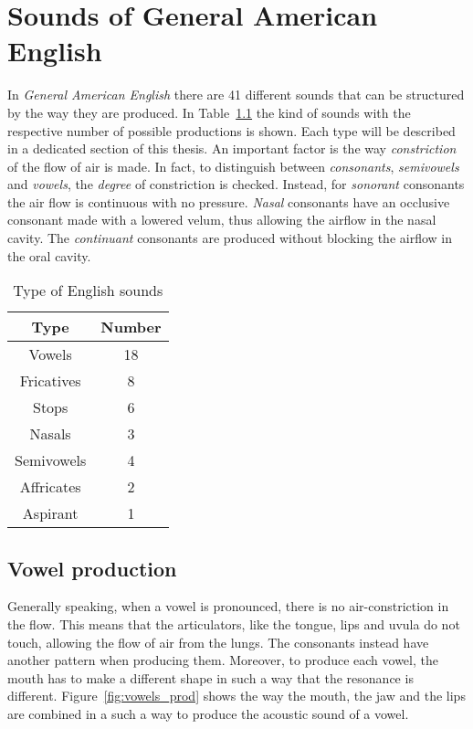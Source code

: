 \chapter{Sounds of General American English}
\label{ch:english_language}
In \textit{General American English} there are 41 different sounds that can be structured by the way they are produced. In Table~\ref{table:english_sounds} the kind of sounds with the respective number of possible productions is shown. Each type will be described in a dedicated section of this thesis. An important factor is the way \textit{constriction} of the flow of air is made. In fact, to distinguish between \textit{consonants}, \textit{semivowels} and \textit{vowels}, the \textit{degree} of constriction is checked. Instead, for \textit{sonorant} consonants the air flow is continuous with no pressure. \textit{Nasal} consonants have an occlusive consonant made with a lowered velum, thus allowing the airflow in the nasal cavity. The \textit{continuant} consonants are produced without blocking the airflow in the oral cavity.

\begin{table}[h]
    \centering
    \begin{tabular}{|c|c|}
        \hline
        \textbf{Type}& \textbf{Number} \\ \hline
        Vowels     & 18     \\ \hline
        Fricatives & 8      \\ \hline
        Stops      & 6      \\ \hline
        Nasals     & 3      \\ \hline
        Semivowels & 4      \\ \hline
        Affricates & 2      \\ \hline
        Aspirant   & 1      \\ \hline
    \end{tabular}
    \caption {Type of English sounds}
\label{table:english_sounds}
\end{table}


\section{Vowel production}
\label{sec:vowel_production}
Generally speaking, when a vowel is pronounced, there is no air-constriction in the flow. This means that the articulators, like the tongue, lips and uvula do not touch, allowing the flow of air from the lungs. The consonants instead have another pattern when producing them. Moreover, to produce each vowel, the mouth has to make a different shape in such a way that the resonance is different. Figure~\ref{fig:vowels_prod} shows the way the mouth, the jaw and the lips are combined in a such a way to produce the acoustic sound of a vowel.

